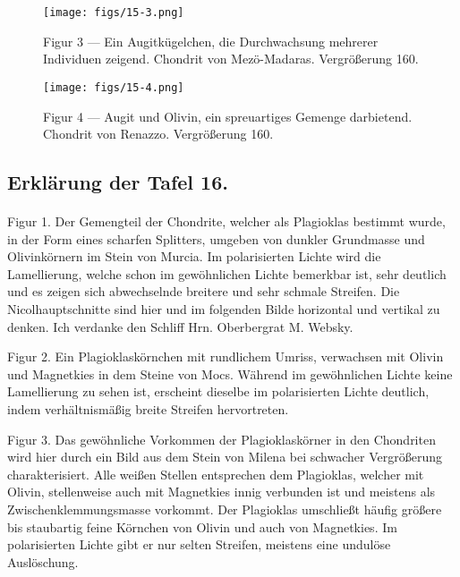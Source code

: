 \documentclass[a4paper, 11pt, oneside, polutonikogreek, german]{article}
\begin{document}
\vspace*{\fill}
\begin{figure}[H]
\centering
\texttt{[image: figs/15-3.png]}
\caption{\small Figur 3 --- Ein Augitkügelchen, die Durchwachsung mehrerer Individuen zeigend. Chondrit von Mezö-Madaras. Vergrößerung 160.}
\end{figure}
\vspace*{\fill}
\clearpage

\vspace*{\fill}
\begin{figure}[H]
\centering
\texttt{[image: figs/15-4.png]}
\caption{\small Figur 4 --- Augit und Olivin, ein spreuartiges Gemenge darbietend. Chondrit von Renazzo. Vergrößerung 160.}
\end{figure}
\vspace*{\fill}
\clearpage

\subsection{Erklärung der Tafel 16.}
\paragraph{}
Figur 1. Der Gemengteil der Chondrite, welcher als Plagioklas bestimmt wurde, in der Form eines scharfen Splitters, umgeben von dunkler Grundmasse und Olivinkörnern im Stein von Murcia. Im polarisierten Lichte wird die Lamellierung, welche schon im gewöhnlichen Lichte bemerkbar ist, sehr deutlich und es zeigen sich abwechselnde breitere und sehr schmale Streifen. Die Nicolhauptschnitte sind hier und im folgenden Bilde horizontal und vertikal zu denken. Ich verdanke den Schliff Hrn. Oberbergrat M. Websky.

Figur 2. Ein Plagioklaskörnchen mit rundlichem Umriss, verwachsen mit Olivin und Magnetkies in dem Steine von Mocs. Während im gewöhnlichen Lichte keine Lamellierung zu sehen ist, erscheint dieselbe im polarisierten Lichte deutlich, indem verhältnismäßig breite Streifen hervortreten.

Figur 3. Das gewöhnliche Vorkommen der Plagioklaskörner in den Chondriten wird hier durch ein Bild aus dem Stein von Milena bei schwacher Vergrößerung charakterisiert. Alle weißen Stellen entsprechen dem Plagioklas, welcher mit Olivin, stellenweise auch mit Magnetkies innig verbunden ist und meistens als Zwischenklemmungsmasse vorkommt. Der Plagioklas umschließt häufig größere bis staubartig feine Körnchen von Olivin und auch von Magnetkies. Im polarisierten Lichte gibt er nur selten Streifen, meistens eine undulöse Auslöschung.
\end{document}
